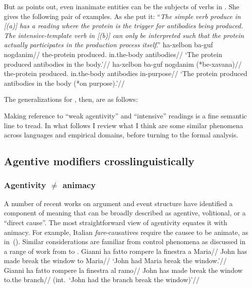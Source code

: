 {But as \citet[21]{doron03} points out, even inanimate entities can be the subjects of verbs in {\tpie}. She gives the following pair of examples. As she put it: ``\textit{The simple verb \emph{produce} in \emph{[(\nextx a)]} has a reading where the protein is the trigger for antibodies being produced. The intensive-template verb in \emph{[(\nextx b)]} can only be interpreted such that the protein actually participates in the production process itself}.''
\pex
	\a \begingl
		\gla ha-xelbon  ba-guf nogdanim//
		\glb the-protein produced. in.the-body antibodies//
		\glft `The protein produced antibodies in the body.'//
		\endgl
	\a \begingl
		\gla ha-xelbon  ba-guf nogdanim (*be-xavana)//
		\glb the-protein produced. in.the-body antibodies in-purpose//
		\glft `The protein produced antibodies in the body (*on purpose).'//
		\endgl
\xe

The generalizations for {\tpie}, then, are as follows:

Making reference to ``weak agentivity'' and ``intensive'' readings is a fine semantic line to tread. In what follows I review what I think are some similar phenomena across languages and empirical domains, before turning to the formal analysis.

	\subsection{Agentive modifiers crosslinguistically} \label{voice:tpiel:act}

		\subsubsection{Agentivity $\ne$ animacy}
A number of recent works on argument and event structure have identified a component of meaning that can be broadly described as agentive, volitional, or a ``direct cause''. The most straightforward view of agentivity equates it with animacy. For example, Italian \emph{fare}-causatives require the causee to be animate, as in~(\nextx). Similar considerations are familiar from control phenomena as discussed in a range of work from \cite{farkas88} to \cite{zu18phd}.
\pex
	\a \begingl
		\gla Gianni ha fatto rompere la finestra a Maria//
		\glb John has made break the window to Maria//
		\glft `John had Maria break the window.'//
		\endgl
	\a \begingl
		\gla \ljudge{\#}Gianni ha fatto rompere la finestra al ramo//
		\glb John has made break the window to.the branch//
		\glft (int.~`John had the branch break the window)'//
		\endgl
\xe	

}
